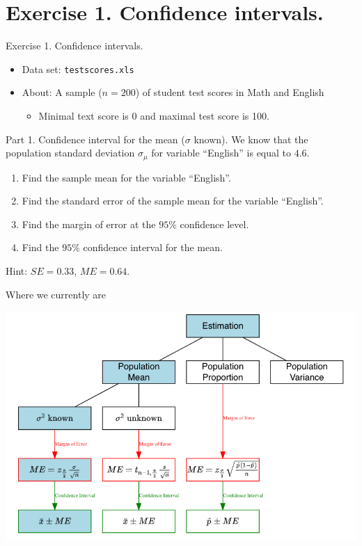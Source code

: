 \documentclass[
  10pt,
  ignorenonframetext,
]{beamer}
\providecommand{\tightlist}{%
  \setlength{\itemsep}{0pt}\setlength{\parskip}{0pt}}
\begin{document}
\hypertarget{exercise-1.-confidence-intervals.}{%
\section{Exercise 1. Confidence
intervals.}\label{exercise-1.-confidence-intervals.}}

\begin{frame}{Exercise 1. Confidence intervals.}
\begin{itemize}
\tightlist
\item
  Data set: \texttt{testscores.xls}
\item
  About: A sample (\(n=200\)) of student test scores in Math and English

  \begin{itemize}
  \tightlist
  \item
    Minimal text score is 0 and maximal test score is 100.
  \end{itemize}
\end{itemize}
\end{frame}

\begin{frame}{Part 1. Confidence interval for the mean (\(\sigma\)
known).}
\protect\hypertarget{part-1.-confidence-interval-for-the-mean-sigma-known.}{}
We know that the population standard deviation \(\sigma_\mu\) for
variable ``English'' is equal to \(4.6\).

\begin{enumerate}
\item
  Find the sample mean for the variable ``English''.
\item
  Find the standard error of the sample mean for the variable
  ``English''.
\item
  Find the margin of error at the \(95\%\) confidence level.
\item
  Find the \(95\%\) confidence interval for the mean.
\end{enumerate}

Hint: \(SE=0.33\), \(ME=0.64\).
\end{frame}

\begin{frame}{Where we currently are}
\protect\hypertarget{where-we-currently-are}{}
\begin{center}\includegraphics[width=0.9\linewidth]{pictures/EstimationGuide-Case1} \end{center}
\end{frame}
\end{document}
